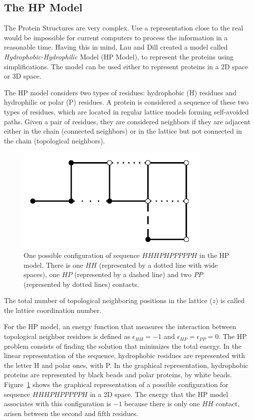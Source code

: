 \subsection{The HP Model}


The Protein Structures are very complex. Use a representation close to the real would be impossible for current computers to process the information in a reasonable time. Having this in mind, Lau and Dill \cite{lau1989lattice} created a model called \textit{Hydrophobic-Hydrophilic} Model (HP Model), to represent the proteins using simplifications. The model can be used either to represent proteins in a 2D space or 3D space.


The HP model considers two types of residues:  hydrophobic (H) residues  and hydrophilic or polar (P) residues. A protein is considered a sequence of these two types of residues, which are located in regular lattice models forming self-avoided paths. Given a pair of residues, they are considered neighbors if they are adjacent  either in the chain (connected neighbors) or  in the lattice but not connected in the chain (topological neighbors).


\begin{figure}[htb!] \label{fig:PROTEXAM}
	\centering
	\includegraphics[scale=0.7]{figures/protein_example.png}
	\caption{One possible configuration of  sequence $HHHPHPPPPPH$ in the HP model. There is one $HH$ (represented by a dotted line with wide spaces), one $HP$ (represented by a dashed line) and  two $PP$  (represented by dotted lines) contacts.}
\end{figure}


The total number of topological neighboring positions in the lattice ($z$) is called the lattice coordination number.


For the HP model, an energy function that  measures the interaction between topological  neighbor residues is defined  as  $\epsilon_{HH}=-1$ and $\epsilon_{HP}=\epsilon_{PP}=0$. The HP problem consists of finding the solution that minimizes the total energy. In the linear representation of the sequence, hydrophobic residues are represented with the letter H and polar ones, with P. In the graphical representation, hydrophobic proteins are represented  by black beads and polar proteins, by white beads. Figure~\ref{fig:PROTEXAM} shows the graphical representation of a possible configuration for  sequence  $HHHPHPPPPPH$ in a 2D space. The energy that the HP model associates with this configuration is $-1$ because there is only one $HH$ contact, arisen between the second and fifth residues.



